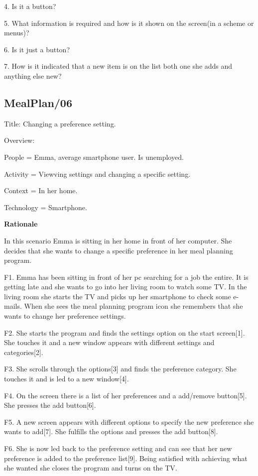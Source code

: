 4. Is it a button?

5. What information is required and how is it shown on the screen(in a scheme or menus)?

6. Is it just a button?

7. How is it indicated that a new item is on the list both one she adds and anything else new?

\subsection{MealPlan/06} \label{MealPlan06}

Title: Changing a preference setting.

Overview:

	People = Emma, average smartphone user. Is unemployed.

	Activity = Viewving settings and changing a specific setting.

	Context = In her home.

	Technology = Smartphone.

\textbf{Rationale}

In this scenario Emma is sitting in her home in front of her computer. She decides that she wants to change a specific preference in her meal planning program.

	F1. Emma has been sitting in front of her pc searching for a job the entire. It is getting late and she wants to go into her living room to watch some TV. In the living room she starts the TV and picks up her smartphone to check some e-mails. When she sees the meal planning program icon she remembers that she wants to change her preference settings.
	
	F2. She starts the program and finds the settings option on the start screen[1]. She touches it and a new window appears with different settings and categories[2].
	
	F3. She scrolls through the options[3] and finds the preference category. She touches it and is led to a new window[4].
	
	F4. On the screen there is a list of her preferences and a add/remove button[5]. She presses the add button[6].
	
	F5. A new screen appears with different options to specify the new preference she wants to add[7]. She fulfills the options and presses the add button[8].
	
	F6. She is now led back to the preference setting and can see that her new preference is added to the preference list[9]. Being satisfied with achieving what she wanted she closes the program and turns on the TV.
	 
